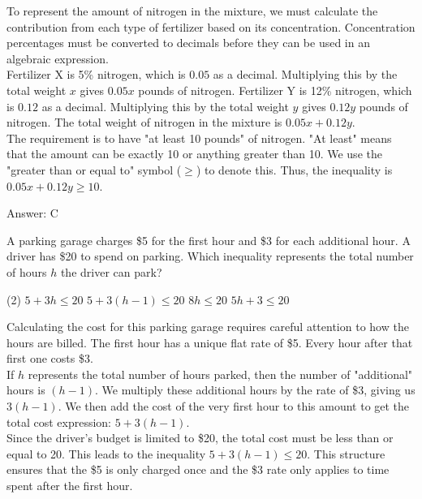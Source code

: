 \documentclass[11pt,paper=a4,answers]{exam}
\begin{document}
\begin{questions}
\begin{solution}
To represent the amount of nitrogen in the mixture, we must calculate the contribution from each type of fertilizer based on its concentration. Concentration percentages must be converted to decimals before they can be used in an algebraic expression.
\\[10pt]
Fertilizer X is 5\% nitrogen, which is $0.05$ as a decimal. Multiplying this by the total weight $x$ gives $0.05x$ pounds of nitrogen. Fertilizer Y is 12\% nitrogen, which is $0.12$ as a decimal. Multiplying this by the total weight $y$ gives $0.12y$ pounds of nitrogen. The total weight of nitrogen in the mixture is $0.05x + 0.12y$.
\\[10pt]
The requirement is to have "at least 10 pounds" of nitrogen. "At least" means that the amount can be exactly 10 or anything greater than 10. We use the "greater than or equal to" symbol ($\geq$) to denote this. Thus, the inequality is $0.05x + 0.12y \geq 10$.

\vspace{15pt}
Answer: \colorbox{yellow!100}{C}
\end{solution}

\question
A parking garage charges \$5 for the first hour and \$3 for each additional hour. A driver has \$20 to spend on parking. Which inequality represents the total number of hours $h$ the driver can park?
\begin{tasks}(2)
    \task $5 + 3h \leq 20$
    \task $5 + 3(h - 1) \leq 20$
    \task $8h \leq 20$
    \task $5h + 3 \leq 20$
\end{tasks}

\begin{solution}
Calculating the cost for this parking garage requires careful attention to how the hours are billed. The first hour has a unique flat rate of \$5. Every hour after that first one costs \$3.
\\[10pt]
If $h$ represents the total number of hours parked, then the number of "additional" hours is $(h - 1)$. We multiply these additional hours by the rate of \$3, giving us $3(h - 1)$. We then add the cost of the very first hour to this amount to get the total cost expression: $5 + 3(h - 1)$.
\\[10pt]
Since the driver's budget is limited to \$20, the total cost must be less than or equal to 20. This leads to the inequality $5 + 3(h - 1) \leq 20$. This structure ensures that the \$5 is only charged once and the \$3 rate only applies to time spent after the first hour.


\end{solution}
\end{questions}
\end{document}
